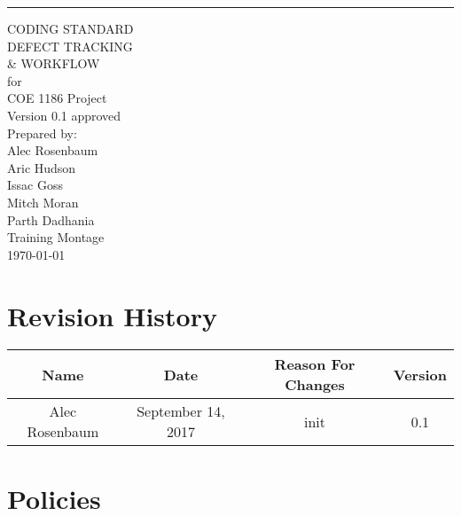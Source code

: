 \documentclass{scrreprt}
\date{}
\def\myversion{0.1 }
\begin{document}
\begin{flushright}
    \rule{16cm}{5pt}\vskip1cm
    \begin{bfseries}
        \Huge{CODING STANDARD\\ 
        DEFECT TRACKING\\ 
        \& WORKFLOW}\\
        \vspace{.9cm}
        for\\
        \vspace{.9cm}
        COE 1186 Project\\
        \vspace{.9cm}
        \LARGE{Version \myversion approved}\\
        \vspace{.9cm}
        Prepared by:\\
        Alec Rosenbaum\\
        Aric Hudson\\
        Issac Goss\\
        Mitch Moran\\
        Parth Dadhania\\
        \vspace{1.9cm}
        Training Montage\\
        \vspace{.9cm}
        \today\\
    \end{bfseries}
\end{flushright}

\tableofcontents

\chapter*{Revision History}

\begin{center}
    \begin{tabular}{|c|c|c|c|}
        \hline
	    Name & Date & Reason For Changes & Version\\
        \hline
	    Alec Rosenbaum & September 14, 2017 & init & 0.1\\
        \hline
    \end{tabular}
\end{center}

\chapter{Policies}
\end{document}
